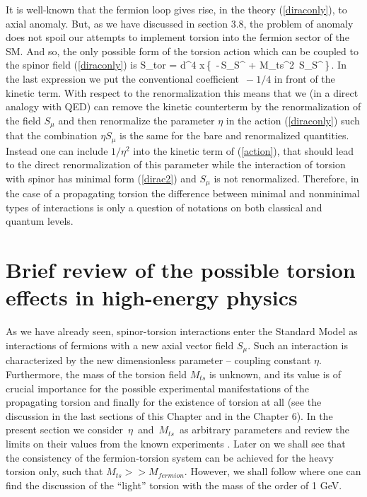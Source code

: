 It is well-known that the fermion loop gives rise, in the theory
(\ref{diraconly}), to axial anomaly. But, as we have 
discussed in section 3.8, the problem 
of anomaly does not spoil our attempts to implement torsion 
into the fermion sector of the SM. 
And so, the only possible form of the torsion action which 
can be coupled to the spinor field (\ref{diraconly}) is
\beq
S_{tor} = \int d^4 x\,\left\{\, -\,S_{\mu\nu}S^{\mu\nu}
+ M_{ts}^2\, S_\mu S^\mu\,\right\}\,.
\label{action}
\eeq
In the last expression we put the conventional coefficient $\,-1/4$
in front of the kinetic term. With respect to the renormalization
this means that we (in a direct analogy with QED) can remove the 
kinetic counterterm by the renormalization of the field $S_\mu$ 
and then renormalize the parameter $\eta$ in the action 
(\ref{diraconly}) such that the combination $\eta S_\mu$ is the 
same for the bare   and renormalized quantities. Instead one can 
include $1/\eta^2$ into the kinetic term of (\ref{action}), that 
should lead to the direct renormalization of
this parameter while the interaction of torsion with spinor has
minimal form (\ref{dirac2}) and $S_\mu$ is not renormalized.
Therefore, in the case of a propagating torsion the difference
between minimal and nonminimal types of interactions is only a
question of notations on both classical and quantum levels.

\section{Brief review of the possible torsion effects in 
high-energy physics}

As we have already seen, spinor-torsion interactions enter the Standard 
Model as interactions of fermions with a new axial vector field 
$S_{\mu}$. Such an interaction is characterized 
by the new dimensionless parameter  -- coupling constant $\eta$. 
Furthermore, the mass of the torsion field $M_{ts}$ is unknown, 
and its value is of crucial importance for the possible experimental
manifestations of the propagating torsion and finally for the 
existence of  torsion at all (see the discussion in the last 
sections of this Chapter and in the Chapter 6). In the present section 
we consider $\,\eta\,$ and $\,M_{ts}\,$ as arbitrary parameters and 
review the limits on their values from the known experiments 
\cite{betor}. Later on we shall see that the consistency of the 
fermion-torsion system can be achieved for the heavy torsion 
only, such that $M_{ts} >> M_{fermion}$. However, we shall follow 
\cite{betor} where one can find the discussion of the ``light'' 
torsion with the mass of the order of 1 GeV. 

